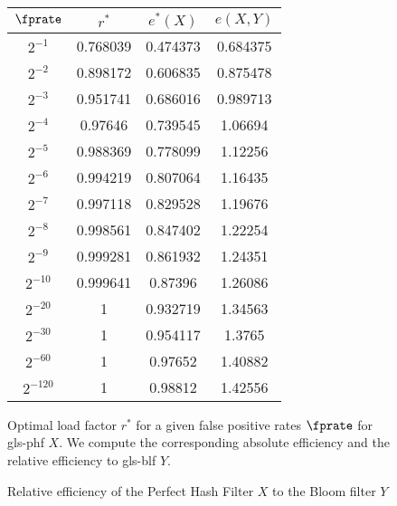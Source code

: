 \begin{figure}
\centering
\caption{Optimal load factor $r^*$ for a given false positive rates $\fprate$ for \gls{gls-phf} $X$. We compute the corresponding absolute efficiency and the relative efficiency to \gls{gls-blf} $Y$.}
\label{fig:abs_eff}
\begin{tabular}{c *{3}{S[table-auto-round,
                 table-format=-1.3]}}
{$\fprate$} & {$r^*$} & {$e^*(X)$} & {$e(X,Y)$}\\
\hline
$2^{-1}$  & 0.768039 & 0.474373 & 0.684375\\ 
$2^{-2}$  & 0.898172 & 0.606835 & 0.875478\\
$2^{-3}$  & 0.951741 & 0.686016 & 0.989713\\
$2^{-4}$  & 0.97646 & 0.739545 & 1.06694\\
$2^{-5}$  & 0.988369 & 0.778099 & 1.12256\\
$2^{-6}$  & 0.994219 & 0.807064 & 1.16435\\
$2^{-7}$  & 0.997118 & 0.829528 & 1.19676\\
$2^{-8}$  & 0.998561 & 0.847402 & 1.22254\\
$2^{-9}$  & 0.999281 & 0.861932 & 1.24351\\
$2^{-10}$ & 0.999641 & 0.87396 & 1.26086\\
$2^{-20}$ & 1 & 0.932719 & 1.34563\\
$2^{-30}$ & 1 & 0.954117 & 1.3765\\
$2^{-60}$ & 1 & 0.97652 & 1.40882\\
$2^{-120}$ & 1 & 0.98812 & 1.42556\\
\end{tabular}
\end{figure}

\begin{figure}
\caption{Relative efficiency of the Perfect Hash Filter $X$ to the Bloom filter $Y$}
\label{fig:rel_eff_bf_PHF}
\centering
{}
\end{figure}


